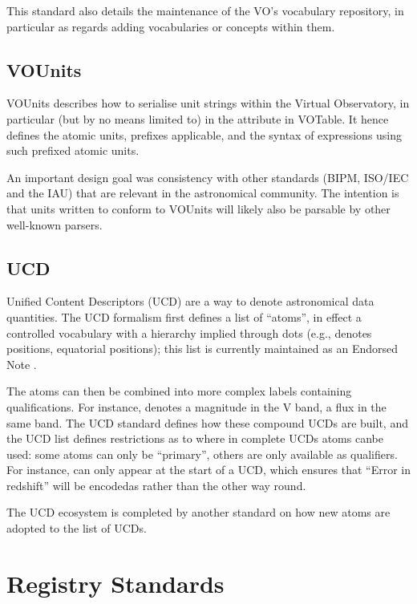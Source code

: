 \documentclass[11pt,letter]{ivoa}
\begin{document}
This standard also details the maintenance of the VO's vocabulary
repository, in particular as regards adding vocabularies or concepts
within them.

\subsection{VOUnits}

VOUnits \citep{2023ivoa.spec.1215G} describes how to serialise unit
strings within the Virtual
Observatory, in particular (but by no means limited to) in the
 attribute in VOTable.  It hence defines the atomic units,
prefixes applicable, and the syntax of expressions using such prefixed
atomic units. 

An important design goal was consistency with other standards (BIPM,
ISO/IEC and the IAU) that are relevant in the astronomical community.
The intention is that units written to conform to VOUnits will likely
also be parsable by other well-known parsers.

\subsection{UCD}

Unified Content Descriptors (UCD) \citep{2019ivoa.spec.1007G} are a way
to
denote astronomical data
quantities.  The UCD formalism first defines a list of ``atoms'', in
effect a controlled vocabulary with a hierarchy implied through dots
(e.g.,  denotes positions,  equatorial positions);
this list is currently maintained as an Endorsed Note
\citep{2021ivoa.spec.0616C}.

The atoms can then be combined into more complex labels containing
qualifications.  For instance,  denotes a
magnitude in the V band,  a flux in the same
band.  The UCD standard defines how these compound UCDs are built, and
the UCD list defines restrictions as to where in complete UCDs atoms canbe used: some atoms can only be ``primary'', others are only available
as qualifiers.  For instance,  can only appear at the
start of a UCD, which ensures that ``Error in redshift'' will be encodedas  rather than the other way round.

The UCD ecosystem is completed by another standard on how new atoms are
adopted to the list of UCDs.

\section{Registry Standards}
\end{document}
